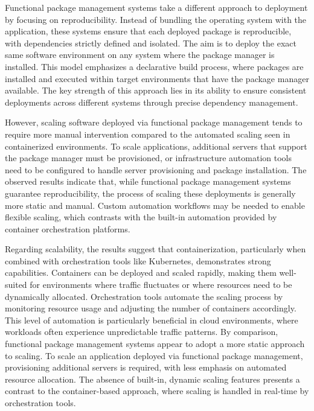 Functional package management systems take a different approach to deployment by focusing on
reproducibility. Instead of bundling the operating system with the application, these systems
ensure that each deployed package is reproducible, with dependencies strictly defined and isolated.
The aim is to deploy the exact same software environment on any system where the package manager
is installed. This model emphasizes a declarative build process, where packages are installed
and executed within target environments that have the package manager available. The key strength
of this approach lies in its ability to ensure consistent deployments across different systems
through precise dependency management.

However, scaling software deployed via functional package management tends to require more
manual intervention compared to the automated scaling seen in containerized environments.
To scale applications, additional servers that support the package manager must be provisioned,
or infrastructure automation tools need to be configured to handle server provisioning and
package installation. The observed results indicate that, while functional package management
systems guarantee reproducibility, the process of scaling these deployments is generally more
static and manual. Custom automation workflows may be needed to enable flexible scaling,
which contrasts with the built-in automation provided by container orchestration platforms.

Regarding scalability, the results suggest that containerization, particularly when combined
with orchestration tools like Kubernetes, demonstrates strong capabilities. Containers can be
deployed and scaled rapidly, making them well-suited for environments where traffic fluctuates
or where resources need to be dynamically allocated. Orchestration tools automate the scaling
process by monitoring resource usage and adjusting the number of containers accordingly. This
level of automation is particularly beneficial in cloud environments, where workloads often
experience unpredictable traffic patterns. By comparison, functional package management systems
appear to adopt a more static approach to scaling. To scale an application deployed via functional
package management, provisioning additional servers is required, with less emphasis on automated
resource allocation. The absence of built-in, dynamic scaling features presents a contrast to
the container-based approach, where scaling is handled in real-time by orchestration tools.

